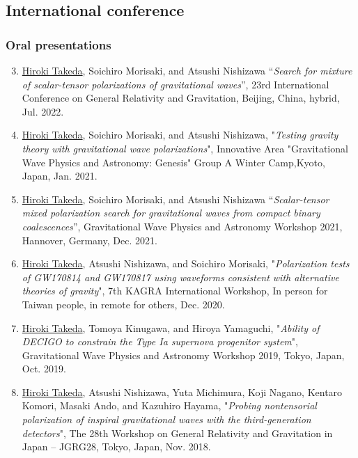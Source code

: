 \documentclass[uplatex, 12pt]{article}
\begin{document}
\subsection*{International conference}
\subsubsection*{Oral presentations}
\begin{enumerate}
\setcounter{enumi}{2}
\item \uline{Hiroki Takeda}, Soichiro Morisaki, and Atsushi Nishizawa “\emph{Search for mixture of scalar-tensor polarizations of gravitational waves}”, 23rd International Conference on General Relativity and Gravitation, Beijing, China, hybrid, Jul. 2022.\\

\item \uline{Hiroki Takeda}, Soichiro Morisaki, and Atsushi Nishizawa,
"\emph{Testing gravity theory with gravitational wave polarizations}",
Innovative Area "Gravitational Wave Physics and Astronomy: Genesis" Group A Winter Camp,Kyoto, Japan, Jan. 2021.\\

\item \uline{Hiroki Takeda}, Soichiro Morisaki, and Atsushi Nishizawa “\emph{Scalar-tensor mixed polarization search for gravitational waves from compact binary coalescences}”, Gravitational Wave Physics and Astronomy Workshop 2021, Hannover, Germany, Dec. 2021.\\

\item \uline{Hiroki Takeda}, Atsushi Nishizawa, and Soichiro Morisaki, "\emph{Polarization tests of GW170814 and GW170817 using waveforms consistent with alternative theories of gravity}", 7th KAGRA International Workshop, In person for Taiwan people, in remote for others, Dec. 2020.\\

\item \uline{Hiroki Takeda}, Tomoya Kinugawa, and Hiroya Yamaguchi, "\emph{Ability of DECIGO to constrain the Type Ia supernova progenitor system}", Gravitational Wave Physics and Astronomy Workshop 2019, Tokyo, Japan, Oct. 2019.\\

\item \uline{Hiroki Takeda}, Atsushi Nishizawa, Yuta Michimura, Koji Nagano, Kentaro Komori, Masaki Ando, and Kazuhiro Hayama, "\emph{Probing nontensorial polarization of inspiral gravitational waves with the third-generation detectors}", The 28th Workshop on General Relativity and Gravitation in Japan – JGRG28, Tokyo, Japan, Nov. 2018.\\


\end{enumerate}
\end{document}
